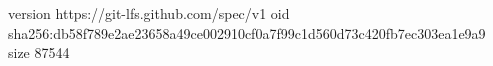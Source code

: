 version https://git-lfs.github.com/spec/v1
oid sha256:db58f789e2ae23658a49ce002910cf0a7f99c1d560d73c420fb7ec303ea1e9a9
size 87544

